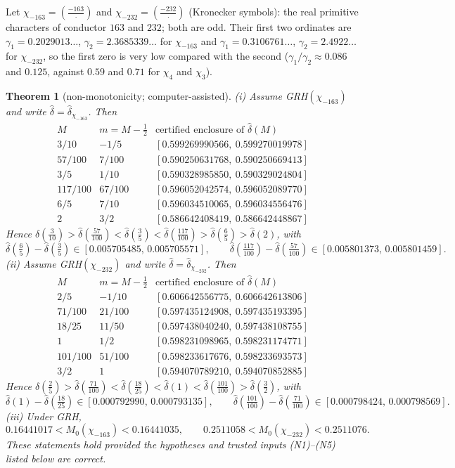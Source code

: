 \documentclass[11pt]{amsart}
\newtheorem{theorem}{Theorem}[section]
\theoremstyle{definition}
\numberwithin{equation}{section}
\newcommand{\hd}{\widehat\delta}
\begin{document}
Let $\chi_{-163}=(\frac{-163}{\cdot})$ and
$\chi_{-232}=(\frac{-232}{\cdot})$ (Kronecker symbols): the real
primitive characters of conductor $163$ and $232$; both are odd. Their
first two ordinates are $\gamma_1=0.2029013\ldots$,
$\gamma_2=2.3685339\ldots$ for $\chi_{-163}$ and
$\gamma_1=0.3106761\ldots$, $\gamma_2=2.4922\ldots$ for $\chi_{-232}$,
so the first zero is very low compared with the second
($\gamma_1/\gamma_2\approx0.086$ and $0.125$, against $0.59$ and $0.71$
for $\chi_4$ and $\chi_3$).

\begin{theorem}[non-monotonicity; computer-assisted]\label{thm:nonmono}
\textup{(i)} Assume GRH$(\chi_{-163})$ and write
$\hd=\hd_{\chi_{-163}}$. Then
\[
\begin{array}{c|c|c}
M & m=M-\tfrac12 & \text{certified enclosure of }\hd(M)\\\hline
3/10 & -1/5 & [0.599269990566,\ 0.599270019978]\\
57/100 & 7/100 & [0.590250631768,\ 0.590250669413]\\
3/5 & 1/10 & [0.590328985850,\ 0.590329024804]\\
117/100 & 67/100 & [0.596052042574,\ 0.596052089770]\\
6/5 & 7/10 & [0.596034510065,\ 0.596034556476]\\
2 & 3/2 & [0.586642408419,\ 0.586642448867]
\end{array}
\]
Hence
$\hd(\tfrac3{10})>\hd(\tfrac{57}{100})<\hd(\tfrac35)<\hd(\tfrac{117}{100})
>\hd(\tfrac65)>\hd(2)$, with
\[
\hd(\tfrac65)-\hd(\tfrac35)\in[0.005705485,\,0.005705571],\qquad
\hd(\tfrac{117}{100})-\hd(\tfrac{57}{100})\in[0.005801373,\,0.005801459].
\]
\textup{(ii)} Assume GRH$(\chi_{-232})$ and write
$\hd=\hd_{\chi_{-232}}$. Then
\[
\begin{array}{c|c|c}
M & m=M-\tfrac12 & \text{certified enclosure of }\hd(M)\\\hline
2/5 & -1/10 & [0.606642556775,\ 0.606642613806]\\
71/100 & 21/100 & [0.597435124908,\ 0.597435193395]\\
18/25 & 11/50 & [0.597438040240,\ 0.597438108755]\\
1 & 1/2 & [0.598231098965,\ 0.598231174771]\\
101/100 & 51/100 & [0.598233617676,\ 0.598233693573]\\
3/2 & 1 & [0.594070789210,\ 0.594070852885]
\end{array}
\]
Hence
$\hd(\tfrac25)>\hd(\tfrac{71}{100})<\hd(\tfrac{18}{25})<\hd(1)
<\hd(\tfrac{101}{100})>\hd(\tfrac32)$, with
\[
\hd(1)-\hd(\tfrac{18}{25})\in[0.000792990,\,0.000793135],\qquad
\hd(\tfrac{101}{100})-\hd(\tfrac{71}{100})\in[0.000798424,\,0.000798569].
\]
\textup{(iii)} Under GRH,
\[
0.16441017<M_0(\chi_{-163})<0.16441035,\qquad
0.2511058<M_0(\chi_{-232})<0.2511076 .
\]
These statements hold provided the hypotheses and trusted inputs
\textup{(N1)--(N5)} listed below are correct.
\end{theorem}
\end{document}
